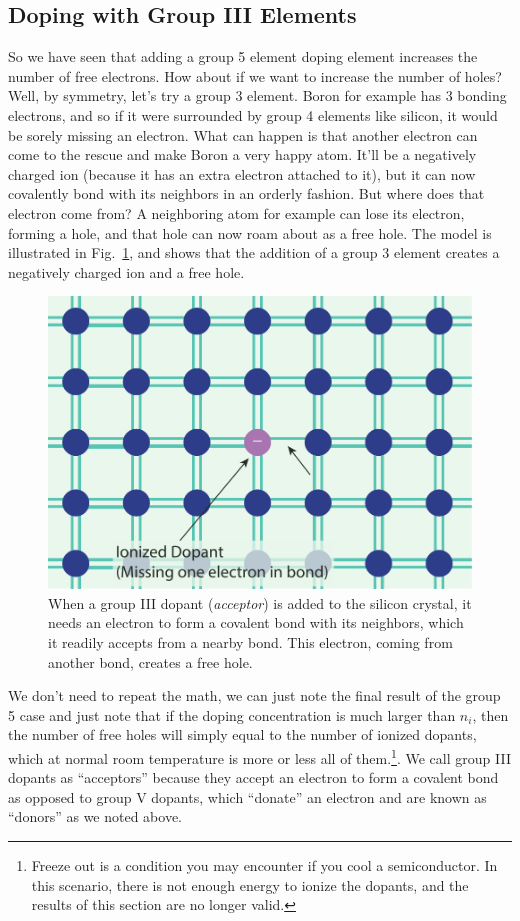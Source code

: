 \subsection{Doping with Group III Elements}
So we have seen that adding a group 5 element doping element increases the number of free electrons.  How about if we want to increase the number of holes?  Well, by symmetry, let’s try a group 3 element.  Boron for example has 3 bonding electrons, and so if it were surrounded by group 4 elements like silicon, it would be sorely missing an electron.  What can happen is that another electron can come to the rescue and make Boron a very happy atom. It’ll be a negatively charged ion (because it has an extra electron attached to it), but it can now covalently bond with its neighbors in an orderly fashion.  But where does that electron come from?  A neighboring atom for example can lose its electron, forming a hole, and that hole can now roam about as a free hole.  The model is illustrated in Fig.~\ref{fig:silicon_dopant_III}, and shows that the addition of a group 3 element creates a negatively charged ion and a free hole.
\begin{figure}[tb]
\centering
\includegraphics[width=.5\columnwidth]{silicon_dopant_III}
\caption{When a group III dopant (\emph{acceptor}) is added to the silicon crystal, it needs an electron to form a covalent bond with its neighbors, which it readily accepts from a nearby bond.  This electron, coming from another bond, creates a free hole.}
\label{fig:silicon_dopant_III}
\end{figure}
We don’t need to repeat the math, we can just note the final result of the group 5 case and just note that if the doping concentration is much larger than $n_i$, then the number of free holes will simply equal to the number of ionized dopants, which at normal room temperature is more or less all of them.\footnote{Freeze out is a condition you may encounter if you cool a semiconductor.  In this scenario, there is not enough energy to ionize the dopants, and the results of this section are no longer valid.}. We call group III dopants as “acceptors” because they accept an electron to form a covalent bond as opposed to group V dopants, which “donate” an electron and are known as “donors” as we noted above.
